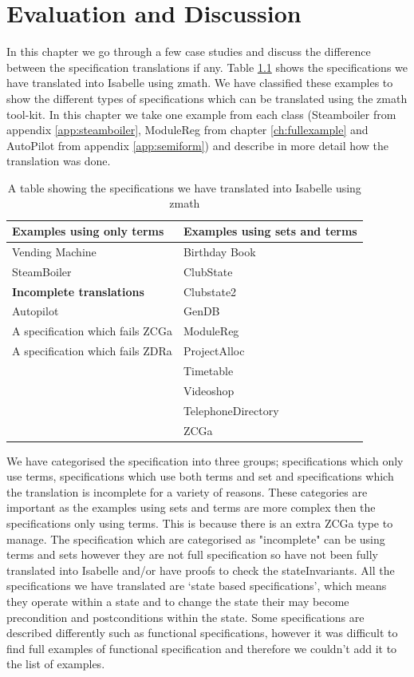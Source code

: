 \chapter{Evaluation and Discussion}
\label{ch:evaluation}

In this chapter we go through a few case studies and discuss the difference
between the specification translations if any. Table \ref{tab:specstranslated}
shows the specifications we have translated into Isabelle using \gls{zmath}. We
have classified these examples to show the different types of specifications
which can be translated using the \gls{zmath} tool-kit. In this chapter we take
one example from each class (Steamboiler from appendix \ref{app:steamboiler}, ModuleReg from chapter \ref{ch:fullexample}
 and AutoPilot from appendix \ref{app:semiform}) 
and describe in more detail how the translation was done.

\begin{table}[H]
\begin{tabular}{|l|l|}
\hline
\textbf{Examples using only terms} & \textbf{Examples using sets and terms} \\
\hline
Vending Machine & Birthday Book \\
SteamBoiler & ClubState \\
\cline{1-1}
\cline{1-1}
\textbf{Incomplete translations} & Clubstate2 \\
\cline{1-1}
Autopilot & GenDB \\
A specification which fails ZCGa & ModuleReg \\
A specification which fails ZDRa & ProjectAlloc \\
& Timetable \\
& Videoshop \\
& TelephoneDirectory \\
& ZCGa \\
\hline
\end{tabular}
\caption{A table showing the specifications we have translated into Isabelle using \gls{zmath} \label{tab:specstranslated}}
\end{table}

We have categorised the specification into three groups; specifications which
only use terms, specifications which use both terms and set and specifications
which the translation is incomplete for a variety of reasons.
These categories are important as the examples using sets and terms are more complex
then the specifications only using terms. This is because there is an extra ZCGa type
to manage. The specification which are categorised as "incomplete" can be using terms
and sets however they are not full specification so have not been fully translated into 
Isabelle and/or have proofs to check the stateInvariants.
All the
specifications we have translated are `state based specifications', which means
they operate within a state and to change the state their may become
precondition and postconditions within the state. Some specifications are
described differently such as functional specifications, however 
it was difficult to find full examples of functional specification and therefore
we couldn't add it to the list of examples.

